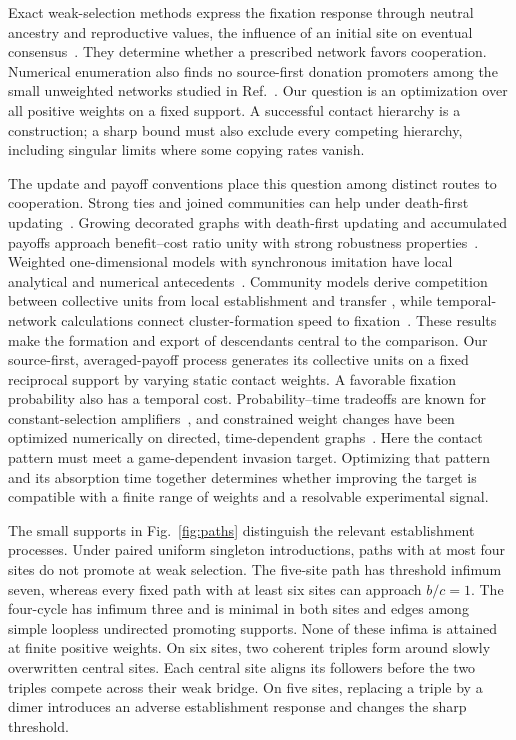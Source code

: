 \documentclass[aps,pre,reprint,amsmath,amssymb,longbibliography]{revtex4-2}
\begin{document}
Exact weak-selection methods express the fixation response through
neutral ancestry and reproductive values, the influence of an initial
site on eventual consensus~\cite{AllenEtAl2017,AllenEtAl2021,McAvoyAllen2021}.
They determine whether a prescribed network favors cooperation.
Numerical enumeration also finds no source-first donation promoters
among the small unweighted networks studied in
Ref.~\cite[Fig.~4A]{WangSu2026}. Our question is an optimization over
all positive weights on a fixed support. A successful contact hierarchy
is a construction; a sharp bound must also exclude every competing
hierarchy, including singular limits where some copying rates vanish.

The update and payoff conventions place this question among distinct
routes to cooperation. Strong ties and joined communities can help
under death-first updating~\cite{AllenEtAl2017,Fotouhi2018Conjoining}.
Growing decorated graphs with death-first updating and accumulated
payoffs approach benefit--cost ratio unity with strong robustness
properties~\cite{SvobodaChatterjee2025}. Weighted one-dimensional
models with synchronous imitation have local analytical and numerical
antecedents~\cite{IwataAkiyama2016}. Community models derive competition
between collective units from local establishment and transfer
\cite{PiresBroom2024Communities,MoawadAbbaraBitbol2024Demes}, while
temporal-network calculations connect cluster-formation speed to
fixation~\cite{LiMengZhouMasudaWang2026}. These results make the
formation and export of descendants central to the comparison.
Our source-first, averaged-payoff process generates its collective
units on a fixed reciprocal support by varying static contact weights.
A favorable fixation probability also has a temporal cost.
Probability--time tradeoffs are known for constant-selection
amplifiers~\cite{SlowTkadlec2019,SlowTkadlec2021}, and constrained
weight changes have been optimized numerically on directed,
time-dependent graphs~\cite{Bonneuil2026Resource}. Here the contact
pattern must meet a game-dependent invasion target. Optimizing that
pattern and its absorption time together determines whether improving
the target is compatible with a finite range of weights and a
resolvable experimental signal.

The small supports in Fig.~\ref{fig:paths} distinguish the relevant
establishment processes. Under paired uniform singleton introductions,
paths with at most four sites do not promote at weak selection. The
five-site path has threshold infimum seven, whereas every fixed path
with at least six sites can approach $b/c=1$. The four-cycle has
infimum three and is minimal in both sites and edges among simple
loopless undirected promoting supports. None of these infima is
attained at finite positive weights. On six sites, two coherent triples
form around slowly overwritten central sites. Each central site aligns
its followers before the two triples compete across their weak bridge.
On five sites, replacing a triple by a dimer introduces an adverse
establishment response and changes the sharp threshold.
\end{document}
